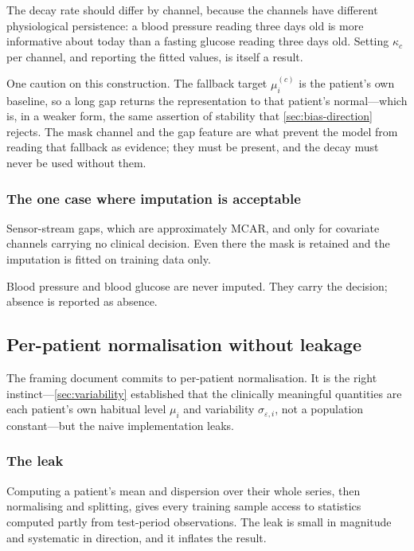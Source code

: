 \documentclass[12pt,a4paper,oneside]{report}
\begin{document}
The decay rate should differ by channel, because the channels have different physiological persistence: a blood pressure reading three days old is more informative about today than a fasting glucose reading three days old. Setting $\kappa_c$ per channel, and reporting the fitted values, is itself a result.

One caution on this construction. The fallback target $\mu^{(c)}_i$ is the patient's own baseline, so a long gap returns the representation to that patient's normal---which is, in a weaker form, the same assertion of stability that \cref{sec:bias-direction} rejects. The mask channel and the gap feature are what prevent the model from reading that fallback as evidence; they must be present, and the decay must never be used without them.

\subsubsection{The one case where imputation is acceptable}

Sensor-stream gaps, which are approximately MCAR, and only for covariate channels carrying no clinical decision. Even there the mask is retained and the imputation is fitted on training data only.

Blood pressure and blood glucose are never imputed. They carry the decision; absence is reported as absence.

\subsection{Per-patient normalisation without leakage}\label{sec:normalisation}

The framing document commits to per-patient normalisation. It is the right instinct---\cref{sec:variability} established that the clinically meaningful quantities are each patient's own habitual level $\mu_i$ and variability $\sigma_{\varepsilon,i}$, not a population constant---but the naive implementation leaks.

\subsubsection{The leak}

Computing a patient's mean and dispersion over their whole series, then normalising and splitting, gives every training sample access to statistics computed partly from test-period observations. The leak is small in magnitude and systematic in direction, and it inflates the result.
\end{document}
